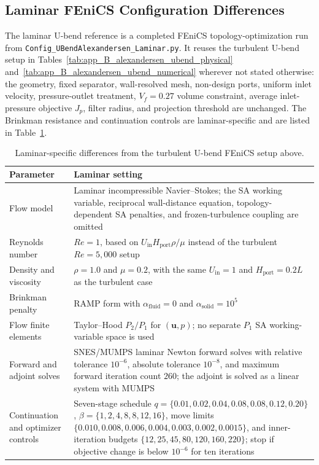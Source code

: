 \FloatBarrier

\subsection{Laminar FEniCS Configuration Differences}
\label{subsec:app_C_alexandersen_ubend_lam_config}
	The laminar U-bend reference is a completed FEniCS topology-optimization run from \texttt{Config\_UBendAlexandersen\_Laminar.py}. It reuses the turbulent U-bend setup in Tables~\ref{tab:app_B_alexandersen_ubend_physical} and~\ref{tab:app_B_alexandersen_ubend_numerical} wherever not stated otherwise: the geometry, fixed separator, wall-resolved mesh, non-design ports, uniform inlet velocity, pressure-outlet treatment, $V_f=0.27$ volume constraint, average inlet-pressure objective $J_p$, filter radius, and projection threshold are unchanged. The Brinkman resistance and continuation controls are laminar-specific and are listed in Table~\ref{tab:app_C_alexandersen_ubend_lam_differences}.

\begin{table}[htbp]
	\centering
	\footnotesize
	\caption{Laminar-specific differences from the turbulent U-bend FEniCS setup above.}
	\label{tab:app_C_alexandersen_ubend_lam_differences}
	\renewcommand{\arraystretch}{1.2}
	\begin{tabularx}{\textwidth}{l X}
		\hline
		\textbf{Parameter} & \textbf{Laminar setting} \\
		\hline
			Flow model & Laminar incompressible Navier--Stokes; the SA working variable, reciprocal wall-distance equation, topology-dependent SA penalties, and frozen-turbulence coupling are omitted \\
			Reynolds number & $Re=1$, based on $U_{\mathrm{in}}H_{\mathrm{port}}\rho/\mu$ instead of the turbulent $Re=5{,}000$ setup \\
			Density and viscosity & $\rho=1.0$ and $\mu=0.2$, with the same $U_{\mathrm{in}}=1$ and $H_{\mathrm{port}}=0.2L$ as the turbulent case \\
			Brinkman penalty & RAMP form with $\alpha_{\mathrm{fluid}}=0$ and $\alpha_{\mathrm{solid}}=10^5$ \\
			Flow finite elements & Taylor--Hood $P_2/P_1$ for $(\mathbf{u},p)$; no separate $P_1$ SA working-variable space is used \\
			Forward and adjoint solves & SNES/MUMPS laminar Newton forward solves with relative tolerance $10^{-6}$, absolute tolerance $10^{-8}$, and maximum forward iteration count $260$; the adjoint is solved as a linear system with MUMPS \\
			Continuation and optimizer controls & Seven-stage schedule $q=\{0.01,0.02,0.04,0.08,0.08,0.12,0.20\}$, $\beta=\{1,2,4,8,8,12,16\}$, move limits $\{0.010,0.008,0.006,0.004,0.003,0.002,0.0015\}$, and inner-iteration budgets $\{12,25,45,80,120,160,220\}$; stop if objective change is below $10^{-6}$ for ten iterations \\
		\hline
	\end{tabularx}
\end{table}

